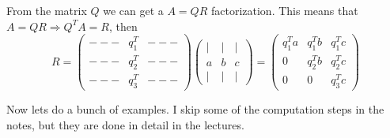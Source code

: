 \documentclass[reqno]{amsart}
\theoremstyle{definition}
\begin{document}
From the matrix $Q$ we can get a $A = QR$ factorization.  This means that $A = QR \Rightarrow Q^TA = R$, then
%
\begin{equation}
R = \begin{pmatrix}
--- & q_1^T & ---\\
--- & q_2^T & ---\\
--- & q_3^T & ---
\end{pmatrix} \begin{pmatrix}
| & | & |\\
a & b & c\\
| & | & |
\end{pmatrix} = \begin{pmatrix}
q_1^Ta & q_1^Tb & q_1^Tc\\
0 & q_2^Tb & q_2^Tc\\
0 & 0 & q_3^Tc
\end{pmatrix}
\end{equation}

\pagebreak

Now lets do a bunch of examples.  I skip some of the computation steps in the notes,
but they are done in detail in the lectures.
\end{document}
